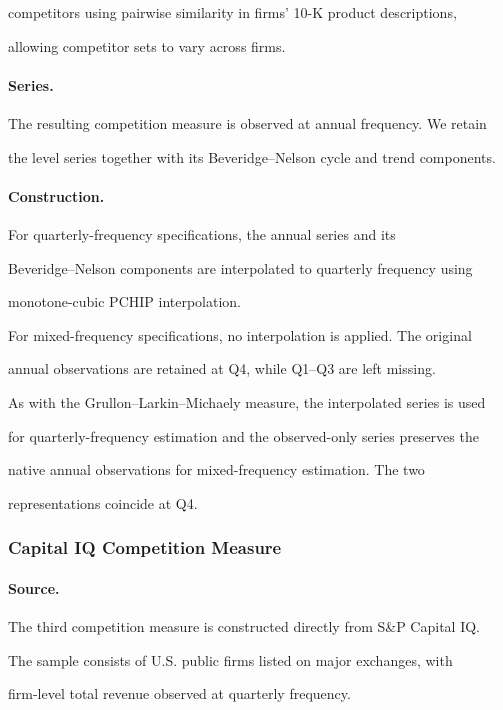 \documentclass[11pt]{article}
\begin{document}
competitors using pairwise similarity in firms' 10-K product descriptions,

allowing competitor sets to vary across firms.

\paragraph{Series.}

The resulting competition measure is observed at annual frequency. We retain

the level series together with its Beveridge--Nelson cycle and trend components.

\paragraph{Construction.}

For quarterly-frequency specifications, the annual series and its

Beveridge--Nelson components are interpolated to quarterly frequency using

monotone-cubic PCHIP interpolation.

For mixed-frequency specifications, no interpolation is applied. The original

annual observations are retained at Q4, while Q1--Q3 are left missing.

As with the Grullon--Larkin--Michaely measure, the interpolated series is used

for quarterly-frequency estimation and the observed-only series preserves the

native annual observations for mixed-frequency estimation. The two

representations coincide at Q4.



\subsubsection{Capital IQ Competition Measure}

\paragraph{Source.}

The third competition measure is constructed directly from S\&P Capital IQ.

The sample consists of U.S. public firms listed on major exchanges, with

firm-level total revenue observed at quarterly frequency.
\end{document}
